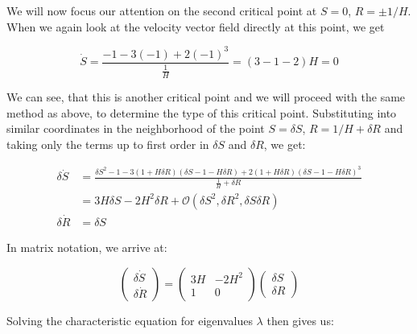 
We will now focus our attention on the second critical point at $S =0$, $R = \pm 1/H$. When we again look at the velocity vector field directly at this point, we get

\begin{equation}
    \dot{S} = \frac{-1 -3(-1) +2 (-1)^3}{\frac{1}{H}} = (3-1-2)H = 0
\end{equation}

\noindent
We can see, that this is another critical point and we will proceed with the same method as above, to determine the type of this critical point. Substituting into similar coordinates in the neighborhood of the point $S = \delta S$, $R = 1/H + \delta R$ and taking only the terms up to first order in $\delta S$ and $\delta R$, we get:

\begin{equation}
    \begin{aligned}
        \delta \dot{S} & =  \frac{\delta S^2 -1 -3 (1 + H\delta R) (\delta S - 1 - H \delta R) + 2 (1+H \delta R) (\delta S - 1 - H \delta R)^3}{\frac{1}{H} + \delta R} \\[0.3cm]
        & =  3 H \delta S - 2H^2 \delta R + \mathcal{O}(\delta S^2, \delta R^2, \delta S \delta R)\\[0.3cm]
        \delta \dot{R} & = \delta S
    \end{aligned}
\end{equation}

\noindent
In matrix notation, we arrive at:

\begin{equation}
    \begin{pmatrix}
        \delta \dot{S} \\ \delta \dot{R}
    \end{pmatrix} = 
    \begin{pmatrix}
        3H & -2H^2 \\
        1 & 0
    \end{pmatrix}
    \begin{pmatrix}
        \delta S \\ \delta R
    \end{pmatrix}
\end{equation}
\vspace{0mm}

\noindent 
Solving the characteristic equation for eigenvalues $\lambda$ then gives us:

